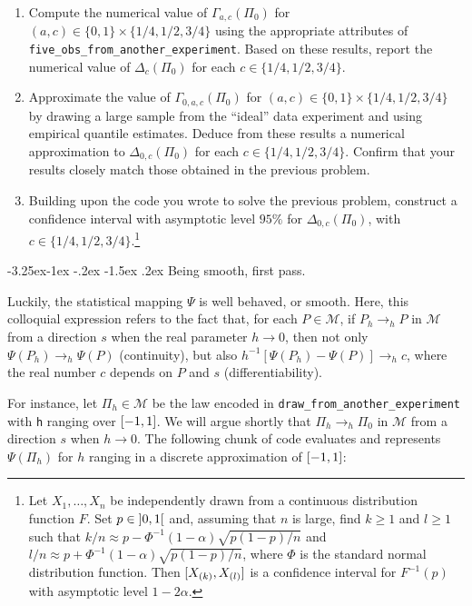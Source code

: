 \documentclass[]{article}
\makeatletter
\let\rmarkdownfootnote\footnote%
\def\footnote{\protect\rmarkdownfootnote}
\renewcommand\subsection{\@startsection{subsection}{3}{\z@}%
                                     {-3.25ex\@plus -1ex \@minus -.2ex}%
                                     {-1.5ex \@plus .2ex}%
                                     {\normalfont\normalsize\bfseries}}
\newcommand{\calM}{\mathcal{M}}
\theoremstyle{definition}
\theoremstyle{definition}
\theoremstyle{definition}
\theoremstyle{remark}
\makeatother
\begin{document}
\begin{enumerate}
\def\labelenumi{\arabic{enumi}.}
\item
  Compute the numerical value of \(\Gamma_{a,c}(\Pi_0)\) for
  \((a,c) \in \{0,1\} \times \{1/4, 1/2, 3/4\}\) using the appropriate
  attributes of \texttt{five\_obs\_from\_another\_experiment}. Based on
  these results, report the numerical value of \(\Delta_c(\Pi_0)\) for
  each \(c \in \{1/4, 1/2, 3/4\}\).
\item
  Approximate the value of \(\Gamma_{0,a,c}(\Pi_{0})\) for
  \((a,c) \in \{0,1\} \times \{1/4, 1/2, 3/4\}\) by drawing a large
  sample from the ``ideal'' data experiment and using empirical quantile
  estimates. Deduce from these results a numerical approximation to
  \(\Delta_{0,c} (\Pi_{0})\) for each \(c \in \{1/4, 1/2, 3/4\}\).
  Confirm that your results closely match those obtained in the previous
  problem.
\item
  Building upon the code you wrote to solve the previous problem,
  construct a confidence interval with asymptotic level \(95\%\) for
  \(\Delta_{0,c} (\Pi_{0})\), with
  \(c \in \{1/4, 1/2, 3/4\}\).\footnote{Let  $X_{1}, \ldots,
  X_{n}$  be  independently drawn  from  a  continuous distribution  function
  $F$. Set  $p \in  \interval[open]{0}{1}$ and, assuming  that $n$  is large,
  find   $k\geq  1$   and  $l   \geq   1$  such   that  $k/n   \approx  p   -
  \Phi^{-1}(1-\alpha)    \sqrt{p(1-p)/n}$    and    $l/n    \approx    p    +
  \Phi^{-1}(1-\alpha) \sqrt{p(1-p)/n}$,  where $\Phi$ is the  standard normal
  distribution function.  Then  $\interval{X_{(k)}}{X_{(l)}}$ is a confidence
  interval for $F^{-1}(p)$ with asymptotic level $1 - 2\alpha$.}
\end{enumerate}

\subsection{Being smooth, first pass.}
\label{subsec:being:smooth:one}

Luckily, the statistical mapping \(\Psi\) is well behaved, or smooth.
Here, this colloquial expression refers to the fact that, for each
\(P \in \calM\), if \(P_{h} \to_{h} P\) in \(\calM\) from a direction
\(s\) when the real parameter \(h \to 0\), then not only
\(\Psi(P_{h}) \to_{h} \Psi(P)\) (continuity), but also
\(h^{-1} [\Psi(P_{h}) - \Psi(P)] \to_{h} c\), where the real number
\(c\) depends on \(P\) and \(s\) (differentiability).

For instance, let \(\Pi_{h} \in \calM\) be the law encoded in
\texttt{draw\_from\_another\_experiment} with \texttt{h} ranging over
\(\interval{-1}{1}\). We will argue shortly that
\(\Pi_{h} \to_{h} \Pi_{0}\) in \(\calM\) from a direction \(s\) when
\(h \to 0\). The following chunk of code evaluates and represents
\(\Psi(\Pi_{h})\) for \(h\) ranging in a discrete approximation of
\(\interval{-1}{1}\):
\end{document}

